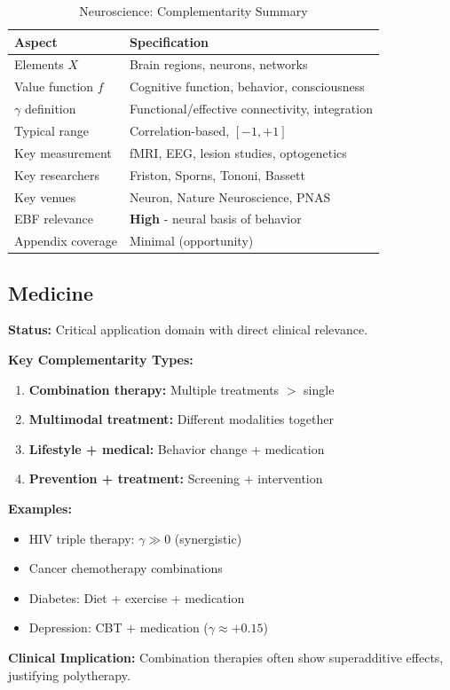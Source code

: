\begin{table}[h]
\centering
\caption{Neuroscience: Complementarity Summary}
\label{tab:neuro-summary}
\renewcommand{\arraystretch}{1.3}
\small
\begin{tabular}{@{}ll@{}}
\toprule
\textbf{Aspect} & \textbf{Specification} \\
\midrule
Elements $X$ & Brain regions, neurons, networks \\
Value function $f$ & Cognitive function, behavior, consciousness \\
$\gamma$ definition & Functional/effective connectivity, integration \\
Typical range & Correlation-based, $[-1, +1]$ \\
Key measurement & fMRI, EEG, lesion studies, optogenetics \\
Key researchers & Friston, Sporns, Tononi, Bassett \\
Key venues & Neuron, Nature Neuroscience, PNAS \\
EBF relevance & \textbf{High} - neural basis of behavior \\
Appendix coverage & Minimal (opportunity) \\
\bottomrule
\end{tabular}
\end{table}

\subsection{Medicine}
\label{sec:med}

\begin{tcolorbox}[colback=red!5!white,colframe=red!75!black,title=\textbf{Medicine: Treatment Complementarity}]

\textbf{Status:} Critical application domain with direct clinical relevance.

\textbf{Key Complementarity Types:}
\begin{enumerate}[noitemsep]
    \item \textbf{Combination therapy:} Multiple treatments $>$ single
    \item \textbf{Multimodal treatment:} Different modalities together
    \item \textbf{Lifestyle + medical:} Behavior change + medication
    \item \textbf{Prevention + treatment:} Screening + intervention
\end{enumerate}

\textbf{Examples:}
\begin{itemize}[noitemsep]
    \item HIV triple therapy: $\gamma \gg 0$ (synergistic)
    \item Cancer chemotherapy combinations
    \item Diabetes: Diet + exercise + medication
    \item Depression: CBT + medication ($\gamma \approx +0.15$)
\end{itemize}

\textbf{Clinical Implication:}
Combination therapies often show superadditive effects, justifying polytherapy.

\end{tcolorbox}

